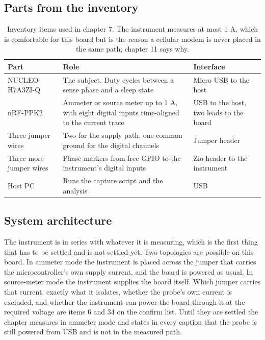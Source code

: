 \subsection*{Parts from the inventory}

\begin{table}[H]\centering\small
\begin{tabular}{p{40mm}p{66mm}p{40mm}}
\toprule
Part & Role & Interface \\
\midrule
NUCLEO-H7A3ZI-Q & The subject. Duty cycles between a sense phase and a sleep state & Micro USB to the host \\
nRF-PPK2 & Ammeter or source meter up to 1 A, with eight digital inputs time-aligned to the current trace & USB to the host, two leads to the board \\
Three jumper wires & Two for the supply path, one common ground for the digital channels & Jumper header \\
Three more jumper wires & Phase markers from free GPIO to the instrument's digital inputs & Zio header to the instrument \\
Host PC & Runs the capture script and the analysis & USB \\
\bottomrule
\end{tabular}
\caption{Inventory items used in chapter 7. The instrument measures at most 1 A, which is comfortable for this board but is the reason a cellular modem is never placed in the same path; chapter 11 says why.}
\end{table}

\subsection*{System architecture}


The instrument is in series with whatever it is measuring, which is the first
thing that has to be settled and is not settled yet. Two topologies are
possible on this board. In ammeter mode the instrument is placed across the
jumper that carries the microcontroller's own supply current, and the board is
powered as usual. In source-meter mode the instrument supplies the board
itself. Which jumper carries that current, exactly what it isolates, whether
the probe's own current is excluded, and whether the instrument can power the
board through it at the required voltage are items 6 and 34 on the confirm
list. Until they are settled the chapter measures in ammeter mode and states in
every caption that the probe is still powered from USB and is not in the
measured path.

